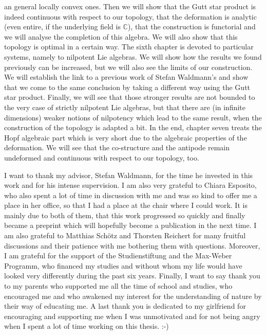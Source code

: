 an general locally convex ones. Then we will show that the Gutt star product is 
indeed continuous with respect to our topology, that the deformation is 
analytic (even entire, if the underlying field is $\mathbb{C}$), that the 
construction is functorial and we will analyse the completion of this algebra. 
We will also show that this topology is optimal in a certain way.
The sixth chapter is devoted to particular systems, namely to nilpotent Lie 
algebras. We will show how the results we found previously can be increased, 
but we will also see the limits of our construction. We will establish 
the link to a previous work of Stefan Waldmann's and show that we come to the 
same conclusion by taking a different way using the Gutt star product. Finally, 
we will see that those stronger results are not bounded to the very case of 
strictly nilpotent Lie algebras, but that there are (in infinite dimensions) 
weaker notions of nilpotency which lead to the same result, when the 
construction of the topology is adapted a bit.
In the end, chapter seven treats the Hopf algebraic part which is very short 
due to the algebraic properties of the deformation. We will see that 
the co-structure and the antipode remain undeformed and continuous with respect 
to our topology, too.


I want to thank my advisor, Stefan Waldmann, for the time he invested in this 
work and for his intense supervision. I am also very grateful to Chiara 
Esposito, who also spent a lot of time in discussion with me and was so kind to 
offer me a place in her office, so that I had a place at the chair where I 
could work. It is mainly due to both of them, that this work progressed so 
quickly and finally became a preprint \cite{esposito.stapor.waldmann:2015a:pre} 
which will hopefully become a publication in the next time. I am also grateful 
to Matthias Sch\"otz and Thorsten Reichert for many fruitful discussions 
and their patience with me bothering them with questions. Moreover, I am 
grateful for the support of the Studienstiftung and the Max-Weber Programm, who 
financed my studies and without whom my life would have looked very 
differently during the past six years. Finally, I want to 
say thank you to my parents who supported me all the time of school and 
studies, who encouraged me and who awakened my interest for the understanding 
of nature by their way of educating me. A last thank you is dedicated to my 
girlfriend for encouraging and supporting me when I was unmotivated and for not 
being angry when I spent a lot of time working on this thesis. :-)
